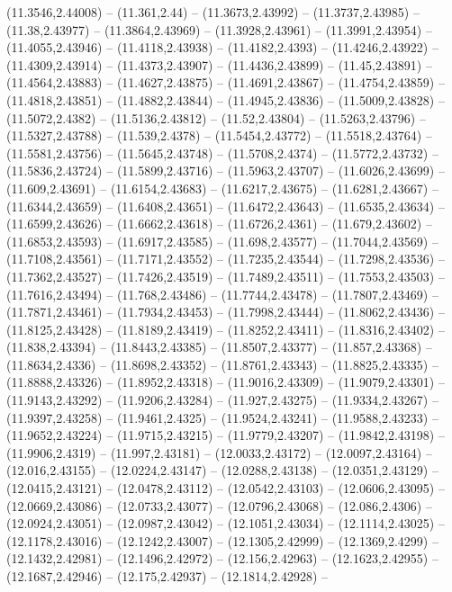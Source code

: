 {(11.3546,2.44008) -- (11.361,2.44) -- (11.3673,2.43992) -- (11.3737,2.43985) -- (11.38,2.43977) -- (11.3864,2.43969) -- (11.3928,2.43961) -- (11.3991,2.43954) -- (11.4055,2.43946) -- (11.4118,2.43938) -- (11.4182,2.4393) -- (11.4246,2.43922) --
(11.4309,2.43914) -- (11.4373,2.43907) -- (11.4436,2.43899) -- (11.45,2.43891) -- (11.4564,2.43883) -- (11.4627,2.43875) -- (11.4691,2.43867) -- (11.4754,2.43859) -- (11.4818,2.43851) -- (11.4882,2.43844) -- (11.4945,2.43836) -- (11.5009,2.43828) --
(11.5072,2.4382) -- (11.5136,2.43812) -- (11.52,2.43804) -- (11.5263,2.43796) -- (11.5327,2.43788) -- (11.539,2.4378) -- (11.5454,2.43772) -- (11.5518,2.43764) -- (11.5581,2.43756) -- (11.5645,2.43748) -- (11.5708,2.4374) -- (11.5772,2.43732) --
(11.5836,2.43724) -- (11.5899,2.43716) -- (11.5963,2.43707) -- (11.6026,2.43699) -- (11.609,2.43691) -- (11.6154,2.43683) -- (11.6217,2.43675) -- (11.6281,2.43667) -- (11.6344,2.43659) -- (11.6408,2.43651) -- (11.6472,2.43643) -- (11.6535,2.43634)
-- (11.6599,2.43626) -- (11.6662,2.43618) -- (11.6726,2.4361) -- (11.679,2.43602) -- (11.6853,2.43593) -- (11.6917,2.43585) -- (11.698,2.43577) -- (11.7044,2.43569) -- (11.7108,2.43561) -- (11.7171,2.43552) -- (11.7235,2.43544) -- (11.7298,2.43536)
-- (11.7362,2.43527) -- (11.7426,2.43519) -- (11.7489,2.43511) -- (11.7553,2.43503) -- (11.7616,2.43494) -- (11.768,2.43486) -- (11.7744,2.43478) -- (11.7807,2.43469) -- (11.7871,2.43461) -- (11.7934,2.43453) -- (11.7998,2.43444) --
(11.8062,2.43436) -- (11.8125,2.43428) -- (11.8189,2.43419) -- (11.8252,2.43411) -- (11.8316,2.43402) -- (11.838,2.43394) -- (11.8443,2.43385) -- (11.8507,2.43377) -- (11.857,2.43368) -- (11.8634,2.4336) -- (11.8698,2.43352) -- (11.8761,2.43343) --
(11.8825,2.43335) -- (11.8888,2.43326) -- (11.8952,2.43318) -- (11.9016,2.43309) -- (11.9079,2.43301) -- (11.9143,2.43292) -- (11.9206,2.43284) -- (11.927,2.43275) -- (11.9334,2.43267) -- (11.9397,2.43258) -- (11.9461,2.4325) -- (11.9524,2.43241) --
(11.9588,2.43233) -- (11.9652,2.43224) -- (11.9715,2.43215) -- (11.9779,2.43207) -- (11.9842,2.43198) -- (11.9906,2.4319) -- (11.997,2.43181) -- (12.0033,2.43172) -- (12.0097,2.43164) -- (12.016,2.43155) -- (12.0224,2.43147) -- (12.0288,2.43138) --
(12.0351,2.43129) -- (12.0415,2.43121) -- (12.0478,2.43112) -- (12.0542,2.43103) -- (12.0606,2.43095) -- (12.0669,2.43086) -- (12.0733,2.43077) -- (12.0796,2.43068) -- (12.086,2.4306) -- (12.0924,2.43051) -- (12.0987,2.43042) -- (12.1051,2.43034) --
(12.1114,2.43025) -- (12.1178,2.43016) -- (12.1242,2.43007) -- (12.1305,2.42999) -- (12.1369,2.4299) -- (12.1432,2.42981) -- (12.1496,2.42972) -- (12.156,2.42963) -- (12.1623,2.42955) -- (12.1687,2.42946) -- (12.175,2.42937) -- (12.1814,2.42928) --
}
